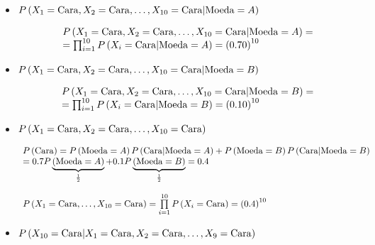 \item
\begin{itemize}
  Dado que os eventos de jogar a moeda são independentes e que os eventos de
  escolher uma das moedas possuem a mesma probabilidade. Temos:

  \item $P\left( {{X_1} = {\rm{Cara}},{X_2} = {\rm{Cara}}, \ldots ,{X_{10}} = {\rm{Cara}}|{\rm{Moeda}} = A} \right)$

  \[\begin{array}{l}
  P\left( {{X_1} = {\rm{Cara}},{X_2} = {\rm{Cara}}, \ldots ,{X_{10}} = {\rm{Cara}}|{\rm{Moeda}} = A} \right) = \\
   = \prod\nolimits_{i = 1}^{10} {P\left( {{X_i} = {\rm{Cara}}|{\rm{Moeda}} = A} \right)}  = {\left( {0.70} \right)^{10}}
  \end{array}\]

  \item $P\left( {{X_1} = {\rm{Cara}},{X_2} = {\rm{Cara}}, \ldots ,{X_{10}} = {\rm{Cara}}|{\rm{Moeda}} = B} \right)$

  \[\begin{array}{l}
  P\left( {{X_1} = {\rm{Cara}},{X_2} = {\rm{Cara}}, \ldots ,{X_{10}} = {\rm{Cara}}|{\rm{Moeda}} = B} \right) = \\
   = \prod\nolimits_{i = 1}^{10} {P\left( {{X_i} = {\rm{Cara}}|{\rm{Moeda}} = B} \right)}  = {\left( {0.10} \right)^{10}}
  \end{array}\]

  \item $P\left( {{X_1} = {\rm{Cara}},{X_2} = {\rm{Cara}}, \ldots ,{X_{10}} = {\rm{Cara}}} \right)$

  \[\begin{array}{l}
  P\left( {{\rm{Cara}}} \right) = P\left( {{\rm{Moeda}} = A} \right)P\left( {{\rm{Cara}}|{\rm{Moeda}} = A} \right) + P\left( {{\rm{Moeda}} = B} \right)P\left( {{\rm{Cara}}|{\rm{Moeda}} = B} \right)\\
   = 0.7P\underbrace {\left( {{\rm{Moeda}} = A} \right)}_{\frac{1}{2}} + 0.1P\underbrace {\left( {{\rm{Moeda}} = B} \right)}_{\frac{1}{2}} = 0.4\\
  \\
  P\left( {{X_1} = {\rm{Cara}}, \ldots ,{X_{10}} = {\rm{Cara}}} \right) = \prod\limits_{i = 1}^{10} {P\left( {{X_i} = {\rm{Cara}}} \right) = {{\left( {0.4} \right)}^{10}}}
  \end{array}\]

  \item $P\left( {{X_{10}} = {\rm{Cara}}|{X_1} = {\rm{Cara}},{X_2} = {\rm{Cara}}, \ldots ,{X_9} = {\rm{Cara}}} \right)$


\end{itemize}
